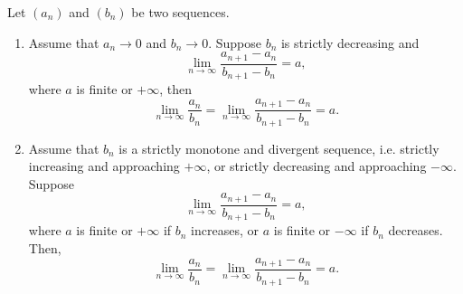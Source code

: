 \begin{theorem}
  Let $(a_n)$ and $(b_n)$ be two sequences.
  \begin{enumerate}
    \item Assume that $a_n \to 0$ and $b_n \to 0$. Suppose $b_n$ is
      strictly decreasing and
      \[ \lim_{n \to \infty} \frac{a_{n + 1} - a_n}{b_{n + 1} - b_n} = a, \]
      where $a$ is finite or $+\infty$, then
      \[ \lim_{n \to \infty} \frac{a_n}{b_n} = \lim_{n \to \infty}
      \frac{a_{n + 1} - a_n}{b_{n + 1} - b_n} = a. \]
    \item Assume that $b_n$ is a strictly monotone and divergent
      sequence, i.e. strictly increasing and approaching $+\infty$,
      or strictly decreasing and approaching $-\infty$. Suppose
      \[ \lim_{n \to \infty} \frac{a_{n + 1} - a_n}{b_{n + 1} - b_n} = a, \]
      where $a$ is finite or $+\infty$ if $b_n$ increases, or $a$ is finite
      or $-\infty$ if $b_n$ decreases. Then,
      \[ \lim_{n \to \infty} \frac{a_n}{b_n} = \lim_{n \to \infty}
      \frac{a_{n + 1} - a_n}{b_{n + 1} - b_n} = a. \]
  \end{enumerate}
\end{theorem}

